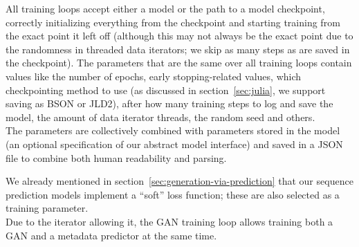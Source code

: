 All training loops accept either a model or the path to a model
checkpoint, correctly initializing everything from the checkpoint and
starting training from the exact point it left off (although this may
not always be the exact point due to the randomness in threaded data
iterators; we skip as many steps as are saved in the checkpoint). The
parameters that are the same over all training loops contain values
like the number of epochs, early stopping-related values, which
checkpointing method to use (as discussed in section~\ref{sec:julia},
we support saving as BSON or JLD2), after how many training steps to
log and save the model, the amount of data iterator threads, the
random seed and others. \\
The parameters are collectively combined with parameters stored in the
model (an optional specification of our abstract model interface) and
saved in a JSON file to combine both human readability and parsing.

We already mentioned in section~\ref{sec:generation-via-prediction}
that our sequence prediction models implement a ``soft'' loss
function; these are also selected as a training parameter. \\
Due to the iterator allowing it, the GAN training loop allows training
both a GAN and a metadata predictor at the same time.


